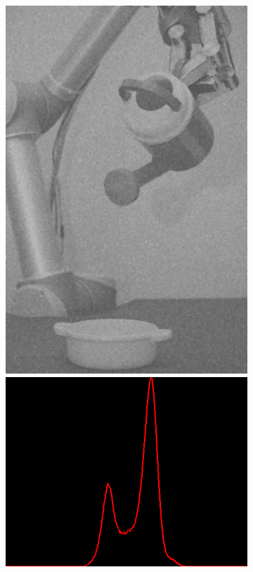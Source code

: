 \begin{figure}[H]
    \centering
    \begin{subfigure}[b]{0.28\textwidth}
        \includegraphics[width=\textwidth]{img2/median.png}\\[0.1cm]
        \includegraphics[width=\textwidth]{img2/hist_11_median_11_final_img2.png}

\end{subfigure}
\end{figure}
